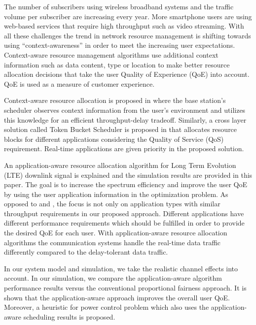 \documentclass[journal]{IEEEtran} 				\IEEEoverridecommandlockouts 	\usepackage{amsmath,amssymb}
\begin{document}
The number of subscribers using wireless broadband systems and the traffic volume per subscriber are increasing every year. More smartphone users are using web-based services that require high throughput such as video streaming. With all these challenges the trend in network resource management is shifting towards using “context-awareness” in order to meet the increasing user expectations. Context-aware resource management algorithms use additional context information such as data content, type or location to make better resource allocation decisions that take the user Quality of Experience (QoE) into account. QoE is used as a measure of customer experience. 

Context-aware resource allocation is proposed in \cite{CARA} where the base station's scheduler observes context information from the user's environment and utilizes this knowledge for an efficient throughput-delay tradeoff. Similarly, a cross layer solution called Token Bucket Scheduler is proposed in \cite{Zhao} that allocates resource blocks for different applications considering the Quality of Service (QoS) requirement. Real-time applications are given priority in the proposed solution. 

An application-aware resource allocation algorithm for Long Term Evolution (LTE) downlink signal is explained and the simulation results are provided in this paper. The goal is to increase the spectrum efficiency and improve the user QoE by using the user application information in the optimization problem. As opposed to \cite{LOU} and \cite{JIANG}, the focus is not only on application types with similar throughput requirements in our proposed approach. Different applications have different performance requirements which should be fulfilled in order to provide the desired QoE for each user. With application-aware resource allocation algorithms the communication systems handle the real-time data traffic differently compared to the delay-tolerant data traffic.

In our system model and simulation, we take the realistic channel effects into account. In our simulation, we compare the application-aware algorithm performance results versus the conventional proportional fairness approach. It is shown that the application-aware approach improves the overall user QoE. Moreover, a heuristic for power control problem which also uses the application-aware scheduling results is proposed.
\end{document}
